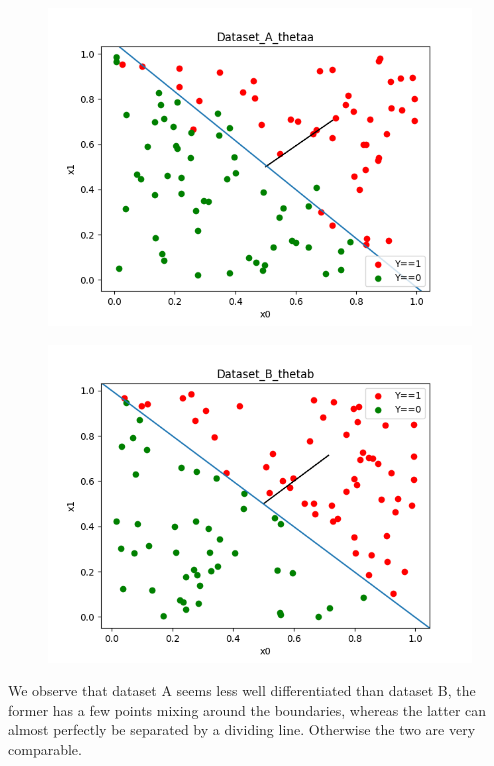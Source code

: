 %
%
\begin{answer}
\begin{figure}[H]
\includegraphics{../src/stability/outputs/Dataset_A_thetaa.png}
\end{figure}
\begin{figure}[H]
	\includegraphics{../src/stability/outputs/Dataset_B_thetab.png}
\end{figure}

We observe that dataset A seems less well differentiated than dataset B, the former has a few points mixing around the boundaries, whereas the latter can almost perfectly be separated by a dividing line. Otherwise the two are very comparable.


\end{answer}
